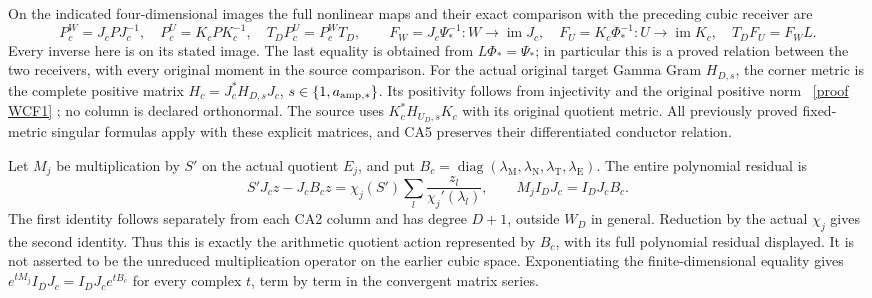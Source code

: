 \documentclass[11pt]{article}
\begin{document}
On the indicated four-dimensional images the full nonlinear maps
and their exact comparison with the preceding cubic receiver are
\[
 P_c^W=J_cPJ_c^{-1},\quad P_c^U=K_cPK_c^{-1},\quad
 T_DP_c^U=P_c^WT_D,\qquad
 F_W=J_c\Psi_*^{-1}:W\to\operatorname{im}J_c,\quad
 F_U=K_c\Phi_*^{-1}:U\to\operatorname{im}K_c,
 \quad T_DF_U=F_WL. \tag{CA5}
\]
Every inverse here is on its stated image. The last equality is
obtained from $L\Phi_*=\Psi_*$; in particular this is a proved
relation between the two receivers, with every original moment
in the source comparison.
For the actual original target Gamma Gram $H_{D,s}$, the corner
metric is the complete positive matrix
$H_c=J_c^*H_{D,s}J_c$, $s\in\{1,a_{\rm amp,*}\}$.
Its positivity follows from injectivity and the original positive
norm \cite{WCF}%
~\href{https://github.com/KokunoYumeto/zeta-function-research-reader/blob/5992ad50c0f2a06921f1fcaded7b4e38097c0739/workbenches/splitzero-tandem/continuations/20260920-original-kernel-mixed-determinants/providers/WEIGHTED_CONDUCTOR_FORWARD.tex\#L28}{[proof WCF1]}%
{}; no column is declared orthonormal.
The source uses $K_c^*H_{U_D,s}K_c$ with its original quotient
metric. All previously proved fixed-metric singular formulas apply
with these explicit matrices, and CA5 preserves their differentiated
conductor relation.

Let $M_j$ be multiplication by $S'$ on the actual quotient $E_j$,
and put $B_c=\operatorname{diag}(\lambda_\mathrm M,
\lambda_\mathrm N,\lambda_\mathrm T,\lambda_\mathrm E)$.
The entire polynomial residual is
\[
 S'J_cz-J_cB_cz
 =\chi_j(S')\sum_l\frac{z_l}{\chi_j'(\lambda_l)},\qquad
 M_j I_DJ_c=I_DJ_c B_c. \tag{CA6}
\]
The first identity follows separately from each CA2 column and
has degree $D+1$, outside $W_D$ in general. Reduction by the
actual $\chi_j$ gives the second identity. Thus this is exactly
the arithmetic quotient action represented by $B_c$, with its
full polynomial residual displayed. It is not asserted to be the
unreduced multiplication operator on the earlier cubic space.
Exponentiating the finite-dimensional equality gives
$e^{tM_j}I_DJ_c=I_DJ_c e^{tB_c}$ for every complex $t$, term
by term in the convergent matrix series.
\end{document}
